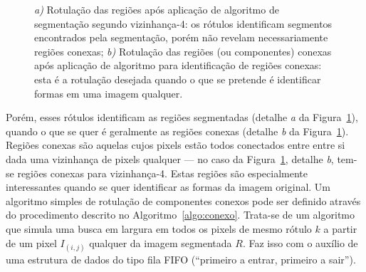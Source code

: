 \begin{figure}[ht!]
\begin{center}


      \caption{\textit{a)} Rotulação das regiões após aplicação de algoritmo de
        segmentação segundo vizinhança-4: os rótulos identificam segmentos
        encontrados pela segmentação, porém não revelam necessariamente regiões
        conexas; \textit{b)} Rotulação das regiões (ou componentes) conexas após
        aplicação de algoritmo para identificação de regiões conexas: esta é a
        rotulação desejada quando o que se pretende é identificar formas em uma
        imagem qualquer.}
        \label{fig:rotulacao}
\end{center}
\end{figure}


Porém, esses rótulos identificam as regiões segmentadas (detalhe \textit{a} da
Figura~\ref{fig:rotulacao}), quando o que se quer é geralmente as regiões
conexas (detalhe \textit{b} da Figura~\ref{fig:rotulacao}). Regiões conexas são
aquelas cujos pixels estão todos conectados entre entre si dada uma vizinhança
de pixels qualquer --- no caso da Figura~\ref{fig:rotulacao}, detalhe
\textit{b}, tem-se regiões conexas para vizinhança-4. Estas regiões são especialmente
interessantes quando se quer identificar as formas da imagem original. Um
algoritmo simples de rotulação de componentes conexos pode ser definido através
do procedimento descrito no Algoritmo~\ref{algo:conexo}. Trata-se de um
algoritmo que simula uma busca em largura em todos os pixels de mesmo rótulo $k$
a partir de um pixel $I_{(i,j)}$ qualquer da imagem segmentada $R$. Faz isso com
o auxílio de uma estrutura de dados do tipo fila FIFO (``primeiro a entrar,
primeiro a sair'').

